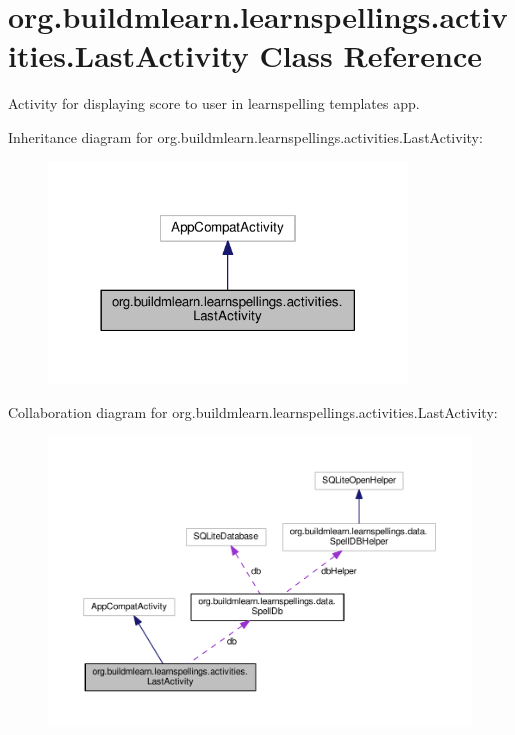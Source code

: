 \hypertarget{classorg_1_1buildmlearn_1_1learnspellings_1_1activities_1_1LastActivity}{}\section{org.\+buildmlearn.\+learnspellings.\+activities.\+Last\+Activity Class Reference}
\label{classorg_1_1buildmlearn_1_1learnspellings_1_1activities_1_1LastActivity}


Activity for displaying score to user in learnspelling template\textquotesingle{}s app.  




Inheritance diagram for org.\+buildmlearn.\+learnspellings.\+activities.\+Last\+Activity\+:
\nopagebreak
\begin{figure}[H]
\begin{center}
\leavevmode
\includegraphics[width=270pt]{classorg_1_1buildmlearn_1_1learnspellings_1_1activities_1_1LastActivity__inherit__graph}
\end{center}
\end{figure}


Collaboration diagram for org.\+buildmlearn.\+learnspellings.\+activities.\+Last\+Activity\+:
\nopagebreak
\begin{figure}[H]
\begin{center}
\leavevmode
\includegraphics[width=350pt]{classorg_1_1buildmlearn_1_1learnspellings_1_1activities_1_1LastActivity__coll__graph}
\end{center}
\end{figure}
